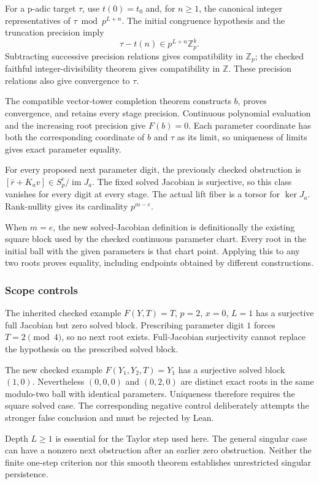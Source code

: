 For a p-adic target \(\tau\), use \(t(0)=t_0\) and, for \(n\ge1\), the
canonical integer representatives of \(\tau\bmod p^{L+n}\). The initial
congruence hypothesis and the truncation precision imply \[
\tau-t(n)\in p^{L+n}\mathbb Z_p^k.
\] Subtracting successive precision relations gives compatibility in
\(\mathbb Z_p\); the checked faithful integer-divisibility theorem gives
compatibility in \(\mathbb Z\). These precision relations also give
convergence to \(\tau\).

The compatible vector-tower completion theorem constructs \(b\), proves
convergence, and retains every stage precision. Continuous polynomial
evaluation and the increasing root precision give \(F(b)=0\). Each
parameter coordinate has both the corresponding coordinate of \(b\) and
\(\tau\) as its limit, so uniqueness of limits gives exact parameter
equality.

For every proposed next parameter digit, the previously checked
obstruction is \([\bar r+K_av]\in S_p^e/\operatorname{im}J_a\). The
fixed solved Jacobian is surjective, so this class vanishes for every
digit at every stage. The actual lift fiber is a torsor for
\(\ker J_a\). Rank-nullity gives its cardinality \(p^{m-e}\).

When \(m=e\), the new solved-Jacobian definition is definitionally the
existing square block used by the checked continuous parameter chart.
Every root in the initial ball with the given parameters is that chart
point. Applying this to any two roots proves equality, including
endpoints obtained by different constructions.

\hypertarget{cont9:scope-controls}{%
\subsubsection{Scope controls}\label{cont9:scope-controls}}

The inherited checked example \(F(Y,T)=T\), \(p=2\), \(x=0\), \(L=1\)
has a surjective full Jacobian but zero solved block. Prescribing
parameter digit \(1\) forces \(T=2\pmod4\), so no next root exists.
Full-Jacobian surjectivity cannot replace the hypothesis on the
prescribed solved block.

The new checked example \(F(Y_1,Y_2,T)=Y_1\) has a surjective solved
block \((1,0)\). Nevertheless \((0,0,0)\) and \((0,2,0)\) are distinct
exact roots in the same modulo-two ball with identical parameters.
Uniqueness therefore requires the square solved case. The corresponding
negative control deliberately attempts the stronger false conclusion and
must be rejected by Lean.

Depth \(L\ge1\) is essential for the Taylor step used here. The general
singular case can have a nonzero next obstruction after an earlier zero
obstruction. Neither the finite one-step criterion nor this smooth
theorem establishes unrestricted singular persistence.
